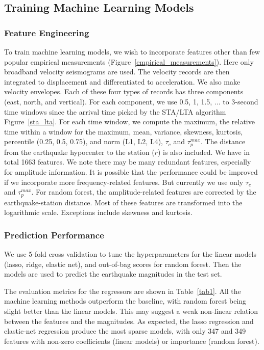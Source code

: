 \documentclass{article} %
\begin{document}
\subsection{Training Machine Learning Models}
\subsubsection{Feature Engineering}
To train machine learning models, we wish to incorporate features other than few popular empirical measurements (Figure~\ref{empirical_measurements}). Here only broadband velocity seismograms are used. The velocity records are then integrated to displacement and differentiated to acceleration. We also make velocity envelopes. Each of these four types of records has three components (east, north, and vertical). For each component, we use 0.5, 1, 1.5, ... to 3-second time windows since the arrival time picked by the STA/LTA algorithm Figure~\ref{sta_lta}. For each time window, we compute the maximum, the relative time within a window for the maximum, mean, variance, skewness, kurtosis, percentile (0.25, 0.5, 0.75), and norm (L1, L2, L4), $\tau_c$ and $\tau_p^{max}$. The distance from the earthquake hypocenter to the station ($r$) is also included. We have in total 1663 features. We note there may be many redundant features, especially for amplitude information. It is possible that the performance could be improved if we incorporate more frequency-related features. But currently we use only $\tau_c$ and $\tau_p^{max}$. For random forest, the amplitude-related features are corrected by the earthquake-station distance. Most of these features are transformed into the logarithmic scale. Exceptions include skewness and kurtosis. 
\subsubsection{Prediction Performance}
We use 5-fold cross validation to tune the hyperparameters for the linear models (lasso, ridge, elastic net), and out-of-bag scores for random forest. Then the models are used to predict the earthquake magnitudes in the test set.

The evaluation metrics for the regressors are shown in Table~\ref{tab1}. All the machine learning methods outperform the baseline, with random forest being slight better than the linear models. This may suggest a weak non-linear relation between the features and the magnitudes. As expected, the lasso regression and elastic-net regression produce the most sparse models, with only 347 and 349 features with non-zero coefficients (linear models) or importance (random forest).   
\end{document}
